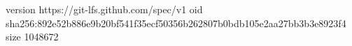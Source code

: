 version https://git-lfs.github.com/spec/v1
oid sha256:892e52b886e9b20bf541f35ecf50356b262807b0bdb105e2aa27bb3b3e8923f4
size 1048672
